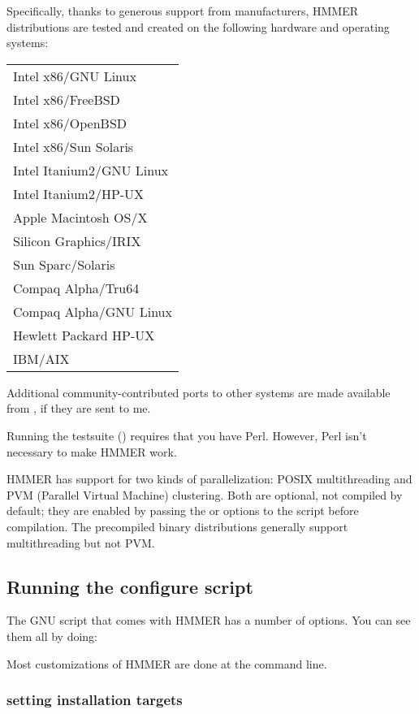 Specifically, thanks to generous support from manufacturers, HMMER
distributions are tested and created on the following hardware and
operating systems:

\begin{tabular}{l}
Intel x86/GNU Linux\\
Intel x86/FreeBSD\\
Intel x86/OpenBSD\\
Intel x86/Sun Solaris \\
Intel Itanium2/GNU Linux\\
Intel Itanium2/HP-UX\\
Apple Macintosh OS/X\\
Silicon Graphics/IRIX\\
Sun Sparc/Solaris \\
Compaq Alpha/Tru64\\
Compaq Alpha/GNU Linux\\
Hewlett Packard HP-UX\\
IBM/AIX\\
\end{tabular}

Additional community-contributed ports to other systems are made
available from
, if they
are sent to me.

Running the testsuite () requires that you have
Perl. However, Perl isn't necessary to make HMMER work.

HMMER has support for two kinds of parallelization: POSIX
multithreading and PVM (Parallel Virtual Machine) clustering.  Both
are optional, not compiled by default; they are enabled by passing the
 or  options to the
 script before compilation. The precompiled binary
distributions generally support multithreading but not PVM.

\subsection{Running the configure script}

The GNU  script that comes with HMMER has a number of
options. You can see them all by doing:


Most customizations of HMMER are done at the 
command line.

\subsubsection{setting installation targets}

